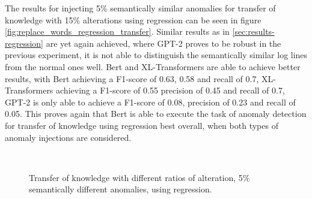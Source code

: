 The results for injecting 5\% semantically similar anomalies for transfer of knowledge with 15\% alterations using regression can be seen in figure \ref{fig:replace_words_regression_transfer}. Similar results as in \ref{sec:results-regression} are yet again achieved, where GPT-2 proves to be robust in the previous experiment, it is not able to distinguish the semantically similar log lines from the normal ones well. Bert and XL-Transformers are able to achieve better results, with Bert achieving a F1-score of 0.63, 0.58 and recall of 0.7, XL-Transformers achieving a F1-score of 0.55 precision of 0.45 and recall of 0.7, GPT-2 is only able to achieve a F1-score of 0.08, precision of 0.23 and recall of 0.05. This proves again that Bert is able to execute the task of anomaly detection for transfer of knowledge using regression best overall, when both types of anomaly injections are considered.

\begin{comment}
\begin{figure}[h]
  \centering
  \texttt{[image: results/transfer/transfer\_regression\_reverse.png]}\\
  \caption{Scores for detecting reversed order of log events for transfer learning, using regression.}
  \label{fig:regression_transfer_reverse}
\end{figure}
\end{comment}

\begin{figure*}[ht!]
  \centering
  \captionsetup{justification=centering}
\hspace{\fill}
\hspace{\fill}
   \\
\caption{\label{fig:results_transfer_regression}Transfer of knowledge with different ratios of alteration, 5\% semantically different anomalies, using regression.}
\end{figure*}



